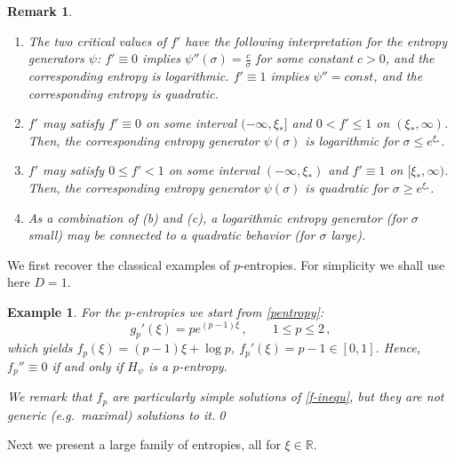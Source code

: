\documentclass[reqno]{amsart}
\newtheorem{remark}[lemma]{Remark}
\newtheorem{example}[lemma]{Example}
\newcommand{\R}{\mathbb{R}}
\begin{document}
\begin{remark}
\begin{enumerate}
\item[(a)] The two critical values of $f'$ have the following interpretation for the entropy generators $\psi$: $f'\equiv0$ implies $\psi''(\sigma)=\frac{c}{\sigma}$ for some constant $c>0$, and the corresponding entropy is logarithmic. 
$f'\equiv1$ implies $\psi''=const$, and the corresponding entropy is quadratic. 
\item[(b)] $f'$ may satisfy $f'\equiv0$ on some interval $(-\infty,\xi_*]$ and $0<f'\le1$ on $(\xi_*,\infty)$. Then, the corresponding entropy generator $\psi(\sigma)$ is logarithmic for $\sigma\le e^{\xi_*}$. 
\item[(c)] $f'$ may satisfy $0\le f'<1$ on some interval $(-\infty,\xi_*)$ and $f'\equiv1$ on $[\xi_*,\infty)$. Then, the corresponding entropy generator $\psi(\sigma)$ is quadratic for $\sigma\ge e^{\xi_*}$. 
\item[(d)] As a combination of (b) and (c), a logarithmic entropy generator (for $\sigma$ small) may be connected to a quadratic behavior (for $\sigma$ large).
\end{enumerate}
\end{remark}

We first recover the classical examples of $p$-entropies. For simplicity we shall use here $D=1$.

\begin{example}\label{p-entropy}
For the $p$-entropies we start from \eqref{pentropy}:
$$
  g_p'(\xi) = pe^{(p-1)\xi}\,,\qquad 1\le p\le2\,,
$$
which yields $f_p(\xi)=(p-1)\xi+\log p$, $f_p'(\xi)=p-1\in[0,1]$.
Hence, $f_p''\equiv0$ if and only if $H_\psi$ is a $p$-entropy.

We remark that $f_p$ are particularly simple solutions of \eqref{f-inequ}, but they are not generic (e.g.\ maximal) solutions to it.\qed
\end{example}

Next we present a large family of entropies, all for $\xi\in\R$. 
\end{document}
